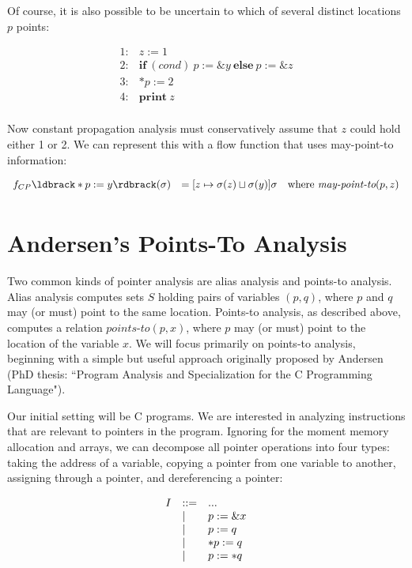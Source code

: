 \documentclass[11pt]{article}
\newcommand{\parg}[1] %
  {\ldbrack #1 \rdbrack}
\newcommand{\join}{\sqcup}
\begin{document}
\begin{sloppypar}
Of course, it is also possible to be uncertain to which of several distinct locations $p$ points:

\[
\begin{array}{ll}
1: & z := 1\\
2: & \mathbf{if}~ (\textit{cond})~ p := \&y ~\mathbf{else}~ p := \&z\\
3: & *p := 2\\
4: & \mathbf{print}~ z\\
\end{array}
\]

Now constant propagation analysis must conservatively assume that $z$ could hold either 1 or 2.  We can represent this with a flow function that uses may-point-to information:

\[
\begin{array}{lll}

f_{CP}\parg{*p := y}(\sigma) & = [z \mapsto \sigma(z) \join \sigma(y)]\sigma & \mbox{where}~ \textit{may-point-to}(p,z)\\[1ex]

\end{array}
\]

\section{Andersen's Points-To Analysis}

Two common kinds of pointer analysis are alias analysis and points-to analysis.  Alias analysis computes sets $S$ holding pairs of variables $(p,q)$, where $p$ and $q$ may (or must) point to the same location.  Points-to analysis, as described above, computes a relation $\textit{points-to}(p,x)$, where $p$ may (or must) point to the location of the variable $x$.  We will focus primarily on points-to analysis, beginning with a simple but useful approach originally proposed by Andersen (PhD thesis: ``Program Analysis and Specialization for the C Programming Language").

Our initial setting will be C programs.  We are interested in analyzing instructions that are relevant to pointers in the program.  Ignoring for the moment memory allocation and arrays, we can decompose all pointer operations into four  types: taking the address of a variable, copying a pointer from one variable to another, assigning through a pointer, and dereferencing a pointer:

\[
\begin{array}{lll}
I & ::= & ... \\
  & \mathrel{\mid} & p := \&x \\
  & \mathrel{\mid} & p := q \\
  & \mathrel{\mid} & *p := q \\
  & \mathrel{\mid} & p := *q \\
\end{array}
\]


\end{sloppypar}
\end{document}
